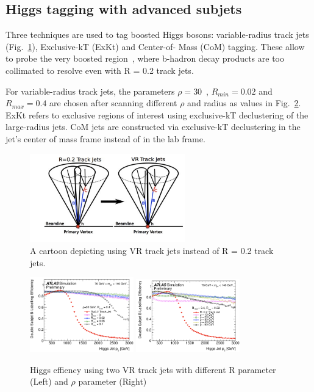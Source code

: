 \subsection{Higgs tagging with advanced subjets}

\par Three techniques are used to tag boosted Higgs bosons: variable-radius track jets (Fig.~\ref{fig:vr}), Exclusive-kT (ExKt) and Center-of- Mass (CoM) tagging. These allow to probe the very boosted region~\cite{ATL-PHYS-PUB-2017-010}, where b-hadron decay products are too collimated to resolve even with R = 0.2 track jets.
\par For variable-radius track jets, the parameters $\rho = 30$~\GeV, $R_{min} = 0.02$ and $R_{max} = 0.4$ 
are chosen after scanning different $\rho$ and radius as values in Fig.~\ref{fig:vr-scan}. ExKt refers to exclusive regions of interest using exclusive-kT declustering of the large-radius jets. 
CoM jets are constructed via exclusive-kT declustering in the jet's center of mass frame instead of in the lab frame.

\begin{figure}[htbp]
    \centering
    \includegraphics[width=0.6\textwidth]{chapters/c5/figures/VR}
    \caption{A cartoon depicting using VR track jets instead of R = 0.2 track jets.}
    \label{fig:vr}
\end{figure}

\begin{figure}[htbp]
    \centering
    \includegraphics[width=0.4\textwidth]{chapters/c5/figures/r-vr}
    \includegraphics[width=0.4\textwidth]{chapters/c5/figures/rho-vr}
    \caption{Higgs effiency using two VR track jets with different R parameter (Left) and $\rho$ parameter (Right)} 
    \label{fig:vr-scan}
\end{figure}

